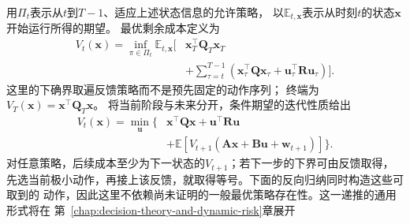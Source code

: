 用$\Pi_t$表示从$t$到$T-1$、适应上述状态信息的允许策略，
以$\mathbb E_{t,\bm x}$表示从时刻$t$的状态$\bm x$开始运行所得的期望。
最优剩余成本定义为
\[
  \begin{aligned}
  V_t(\bm x)=\inf_{\pi\in\Pi_t}\mathbb E_{t,\bm x}\biggl[
    &\bm x_T^\top\bm Q_T\bm x_T\\
    &+\sum_{\tau=t}^{T-1}
      (\bm x_\tau^\top\bm Q\bm x_\tau+
       \bm u_\tau^\top\bm R\bm u_\tau)\biggr].
  \end{aligned}
\]
这里的下确界取遍反馈策略而不是预先固定的动作序列；
终端为$V_T(\bm x)=\bm x^\top\bm Q_T\bm x$。
将当前阶段与未来分开，条件期望的迭代性质给出
\begin{equation}
  \begin{aligned}
  V_t(\bm x)=\min_{\bm u}\bigl\{&
    \bm x^\top\bm Q\bm x+\bm u^\top\bm R\bm u\\
    &+\mathbb E[V_{t+1}(\bm A\bm x+\bm B\bm u+\bm w_{t+1})]\bigr\}.
  \end{aligned}
  \label{eq:control-lqr-bellman}
\end{equation}
对任意策略，后续成本至少为下一状态的$V_{t+1}$；若下一步的下界可由反馈取得，
先选当前极小动作，再接上该反馈，就取得等号。下面的反向归纳同时构造这些可取到的
动作，因此这里不依赖尚未证明的一般最优策略存在性。这一递推的通用形式将在
第~\ref{chap:decision-theory-and-dynamic-risk}章展开

